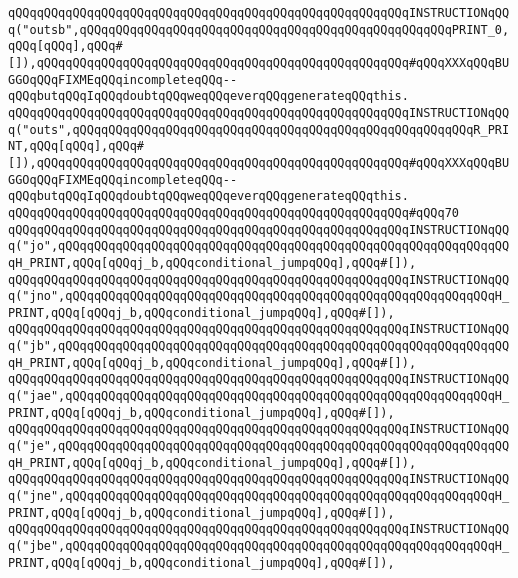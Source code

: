 \verb|qQQqqQQqqQQqqQQqqQQqqQQqqQQqqQQqqQQqqQQqqQQqqQQqqQQqqQQqINSTRUCTIONqQQq("outsb",qQQqqQQqqQQqqQQqqQQqqQQqqQQqqQQqqQQqqQQqqQQqqQQqqQQqPRINT_0,qQQq[qQQq],qQQq#[]),qQQqqQQqqQQqqQQqqQQqqQQqqQQqqQQqqQQqqQQqqQQqqQQqqQQq#qQQqXXXqQQqBUGGOqQQqFIXMEqQQqincompleteqQQq--qQQqbutqQQqIqQQqdoubtqQQqweqQQqeverqQQqgenerateqQQqthis.|\newline
\verb|qQQqqQQqqQQqqQQqqQQqqQQqqQQqqQQqqQQqqQQqqQQqqQQqqQQqqQQqINSTRUCTIONqQQq("outs",qQQqqQQqqQQqqQQqqQQqqQQqqQQqqQQqqQQqqQQqqQQqqQQqqQQqqQQqR_PRINT,qQQq[qQQq],qQQq#[]),qQQqqQQqqQQqqQQqqQQqqQQqqQQqqQQqqQQqqQQqqQQqqQQqqQQq#qQQqXXXqQQqBUGGOqQQqFIXMEqQQqincompleteqQQq--qQQqbutqQQqIqQQqdoubtqQQqweqQQqeverqQQqgenerateqQQqthis.|\newline
\verb|qQQqqQQqqQQqqQQqqQQqqQQqqQQqqQQqqQQqqQQqqQQqqQQqqQQqqQQq#qQQq70|\newline
\verb|qQQqqQQqqQQqqQQqqQQqqQQqqQQqqQQqqQQqqQQqqQQqqQQqqQQqqQQqINSTRUCTIONqQQq("jo",qQQqqQQqqQQqqQQqqQQqqQQqqQQqqQQqqQQqqQQqqQQqqQQqqQQqqQQqqQQqqQQqH_PRINT,qQQq[qQQqj_b,qQQqconditional_jumpqQQq],qQQq#[]),|\newline
\verb|qQQqqQQqqQQqqQQqqQQqqQQqqQQqqQQqqQQqqQQqqQQqqQQqqQQqqQQqINSTRUCTIONqQQq("jno",qQQqqQQqqQQqqQQqqQQqqQQqqQQqqQQqqQQqqQQqqQQqqQQqqQQqqQQqqQQqH_PRINT,qQQq[qQQqj_b,qQQqconditional_jumpqQQq],qQQq#[]),|\newline
\verb|qQQqqQQqqQQqqQQqqQQqqQQqqQQqqQQqqQQqqQQqqQQqqQQqqQQqqQQqINSTRUCTIONqQQq("jb",qQQqqQQqqQQqqQQqqQQqqQQqqQQqqQQqqQQqqQQqqQQqqQQqqQQqqQQqqQQqqQQqH_PRINT,qQQq[qQQqj_b,qQQqconditional_jumpqQQq],qQQq#[]),|\newline
\verb|qQQqqQQqqQQqqQQqqQQqqQQqqQQqqQQqqQQqqQQqqQQqqQQqqQQqqQQqINSTRUCTIONqQQq("jae",qQQqqQQqqQQqqQQqqQQqqQQqqQQqqQQqqQQqqQQqqQQqqQQqqQQqqQQqqQQqH_PRINT,qQQq[qQQqj_b,qQQqconditional_jumpqQQq],qQQq#[]),|\newline
\verb|qQQqqQQqqQQqqQQqqQQqqQQqqQQqqQQqqQQqqQQqqQQqqQQqqQQqqQQqINSTRUCTIONqQQq("je",qQQqqQQqqQQqqQQqqQQqqQQqqQQqqQQqqQQqqQQqqQQqqQQqqQQqqQQqqQQqqQQqH_PRINT,qQQq[qQQqj_b,qQQqconditional_jumpqQQq],qQQq#[]),|\newline
\verb|qQQqqQQqqQQqqQQqqQQqqQQqqQQqqQQqqQQqqQQqqQQqqQQqqQQqqQQqINSTRUCTIONqQQq("jne",qQQqqQQqqQQqqQQqqQQqqQQqqQQqqQQqqQQqqQQqqQQqqQQqqQQqqQQqqQQqH_PRINT,qQQq[qQQqj_b,qQQqconditional_jumpqQQq],qQQq#[]),|\newline
\verb|qQQqqQQqqQQqqQQqqQQqqQQqqQQqqQQqqQQqqQQqqQQqqQQqqQQqqQQqINSTRUCTIONqQQq("jbe",qQQqqQQqqQQqqQQqqQQqqQQqqQQqqQQqqQQqqQQqqQQqqQQqqQQqqQQqqQQqH_PRINT,qQQq[qQQqj_b,qQQqconditional_jumpqQQq],qQQq#[]),|\newline

